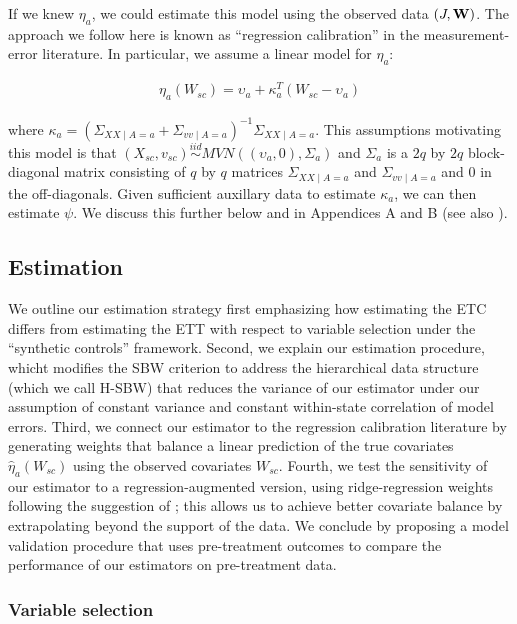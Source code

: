 If we knew $\eta_a$, we could estimate this model using the observed data $(J, \mathbf{W})$. The approach we follow here is known as ``regression calibration'' in the measurement-error literature. In particular, we assume a linear model for $\eta_a$:

\begin{align*}
\eta_a(W_{sc}) = \upsilon_a + \kappa_a^T(W_{sc} - \upsilon_a)
\end{align*}

where $\kappa_a = (\Sigma_{XX \mid A = a} + \Sigma_{vv \mid A = a})^{-1}\Sigma_{XX \mid A = a}$. This assumptions motivating this model is that $(X_{sc}, v_{sc}) \stackrel{iid}\sim MVN((\upsilon_a, 0), \Sigma_a)$ and $\Sigma_a$ is a $2q$ by $2q$ block-diagonal matrix consisting of $q$ by $q$ matrices $\Sigma_{XX \mid A = a}$ and $\Sigma_{vv \mid A = a}$ and $0$ in the off-diagonals. Given sufficient auxillary data to estimate $\kappa_a$, we can then estimate $\psi$. We discuss this further below and in Appendices A and B (see also \cite{gleser1992importance}).

\subsection{Estimation}

We outline our estimation strategy first emphasizing how estimating the ETC differs from estimating the ETT with respect to variable selection under the ``synthetic controls'' framework. Second, we explain our estimation procedure, whicht modifies the SBW criterion to address the hierarchical data structure (which we call H-SBW) that reduces the variance of our estimator under our assumption of constant variance and constant within-state correlation of model errors. Third, we connect our estimator to the regression calibration literature by generating weights that balance a linear prediction of the true covariates $\hat{\eta}_a(W_{sc})$ using the observed covariates $W_{sc}$. Fourth, we test the sensitivity of our estimator to a regression-augmented version, using ridge-regression weights following the suggestion of \cite{ben2018augmented}; this allows us to achieve better covariate balance by extrapolating beyond the support of the data. We conclude by proposing a model validation procedure that uses pre-treatment outcomes to compare the performance of our estimators on pre-treatment data.

\subsubsection{Variable selection}

